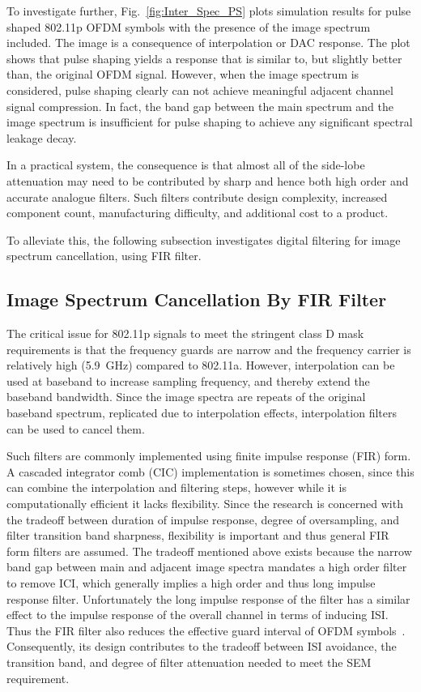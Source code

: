 To investigate further, Fig.~\ref{fig:Inter_Spec_PS} plots simulation results for pulse shaped 802.11p OFDM symbols with the presence of the image spectrum included.
The image is a consequence of interpolation or DAC response.
The plot shows that pulse shaping yields a response that is similar to, but slightly better than, the original OFDM signal.
However, when the image spectrum is considered, pulse shaping clearly can not achieve meaningful adjacent channel signal compression. 
In fact, the band gap between the main spectrum and the image spectrum is insufficient for pulse shaping to achieve any significant spectral leakage decay.

In a practical system, the consequence is that almost all of the side-lobe attenuation may need to be contributed by sharp and hence both high order and accurate analogue filters.
Such filters contribute design complexity, increased component count, manufacturing difficulty, and additional cost to a product.

To alleviate this, the following subsection investigates digital filtering for image spectrum cancellation, using FIR filter.

\subsection{Image Spectrum Cancellation By FIR Filter}
\label{subsec:FIR}
The critical issue for 802.11p signals to meet the stringent class D mask requirements is that the frequency guards are narrow and the frequency carrier is relatively high (5.9~GHz) compared to 802.11a.
However, interpolation can be used at baseband to increase sampling frequency, and thereby extend the baseband bandwidth.
Since the image spectra are repeats of the original baseband spectrum, replicated due to interpolation effects, interpolation filters can be used to cancel them.

Such filters are commonly implemented using finite impulse response (FIR) form. A cascaded integrator comb (CIC) implementation is sometimes chosen, since this can combine the interpolation and filtering steps, however while it is computationally efficient it lacks flexibility.
Since the research is concerned with the tradeoff between duration of impulse response, degree of oversampling, and filter transition band sharpness, flexibility is important and thus general FIR form filters are assumed.
The tradeoff mentioned above exists because the narrow band gap between main and adjacent image spectra mandates a high order filter to remove ICI, which generally implies a high order and thus long impulse response filter. 
Unfortunately the long impulse response of the filter has a similar effect to the impulse response of the overall channel in terms of inducing ISI. 
Thus the FIR filter also reduces the effective guard interval of OFDM symbols~\cite{farhang2008signal}.
Consequently, its design contributes to the tradeoff between ISI avoidance, the transition band, and degree of filter attenuation needed to meet the SEM requirement.

